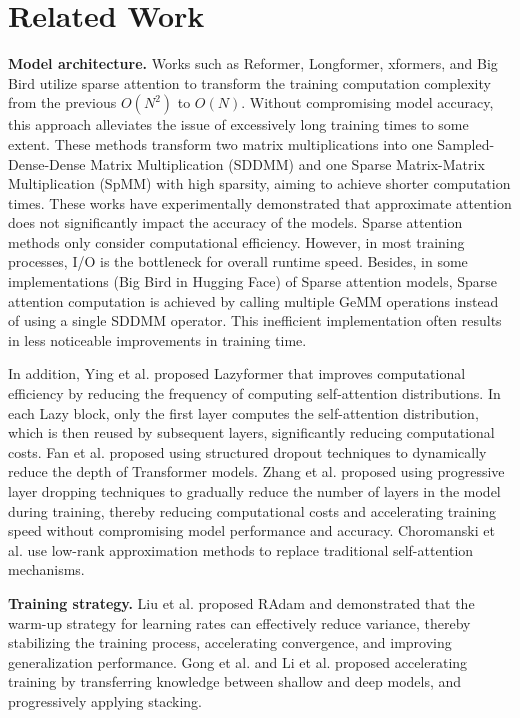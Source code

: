 \section{Related Work}
\label{sec6}

\textbf{Model architecture.} Works such as Reformer\cite{kitaev2020reformer}, Longformer\cite{beltagy2020longformer}, xformers\cite{xFormers2022}, and Big Bird\cite{zaheer2020big} utilize sparse attention to transform the training computation complexity from the previous $O(N^2)$ to $O(N)$. 
Without compromising model accuracy, this approach alleviates the issue of excessively long training times to some extent.  
These methods transform two matrix multiplications into one Sampled-Dense-Dense Matrix Multiplication (SDDMM) and one Sparse Matrix-Matrix Multiplication (SpMM) with high sparsity, aiming to achieve shorter computation times. 
These works have experimentally demonstrated that approximate attention does not significantly impact the accuracy of the models.
Sparse attention methods only consider computational efficiency. 
However, in most training processes, I/O is the bottleneck for overall runtime speed. 
Besides, in some implementations (Big Bird in Hugging Face\cite{wolf-etal-2020-transformers}) of Sparse attention models, Sparse attention computation is achieved by calling multiple GeMM operations instead of using a single SDDMM operator. 
This inefficient implementation often results in less noticeable improvements in training time.

In addition, Ying et al.\cite{ying2021lazyformer} proposed Lazyformer that improves computational efficiency by reducing the frequency of computing self-attention distributions. 
In each Lazy block, only the first layer computes the self-attention distribution, which is then reused by subsequent layers, significantly reducing computational costs. 
Fan et al.\cite{fan2019reducing} proposed using structured dropout techniques to dynamically reduce the depth of Transformer models. 
Zhang et al.\cite{zhang2020accelerating} proposed using progressive layer dropping techniques to gradually reduce the number of layers in the model during training, thereby reducing computational costs and accelerating training speed without compromising model performance and accuracy. 
Choromanski et al.\cite{choromanski2020rethinking} use low-rank approximation methods to replace traditional self-attention mechanisms.

\noindent\textbf{Training strategy.} Liu et al.\cite{liu2019variance} proposed RAdam and demonstrated that the warm-up strategy for learning rates can effectively reduce variance, thereby stabilizing the training process, accelerating convergence, and improving generalization performance. 
Gong et al.\cite{gong2019efficient} and Li et al.\cite{li2020shallow} proposed accelerating training by transferring knowledge between shallow and deep models, and progressively applying stacking.

